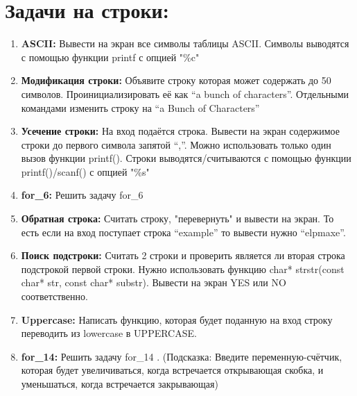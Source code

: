 \documentclass{article}
\begin{document}

\section*{Задачи на строки:}
\begin{enumerate}
\item \textbf{ASCII:} Вывести на экран все символы таблицы ASCII. Символы выводятся с помощью функции printf с опцией "\%c"
\item \textbf{Модификация строки:} Объявите строку которая может содержать до 50 символов. Проинициализировать её как ``a bunch of characters''. Отдельными командами изменить строку на ``a Bunch of Characters''
\item \textbf{Усечение строки:} На вход подаётся строка. Вывести на экран содержимое строки до первого символа запятой ``,''. Можно использовать только один вызов функции printf(). Строки выводятся/считываются с помощью функции printf()/scanf() с опцией "\%s"
\item \textbf{for\_6:} Решить задачу for\_6
\item \textbf{Обратная строка:} Считать строку, "перевернуть" и вывести на экран. То есть если на вход поступает строка ``example''  то вывести нужно ``elpmaxe''.
\item \textbf{Поиск подстроки:} Считать 2 строки и проверить является ли вторая строка подстрокой первой строки. Нужно использовать функцию char* strstr(const char* str, const char* substr). Вывести на экран YES или NO соответственно.
\item \textbf{Uppercase:} Написать функцию, которая будет поданную на вход строку переводить из lowercase в UPPERCASE.
\item \textbf{for\_14:} Решить задачу for\_14 . (Подсказка: Введите переменную-счётчик, которая будет увеличиваться, когда встречается открывающая скобка, и уменьшаться, когда встречается закрывающая)
\end{enumerate}
\end{document}

